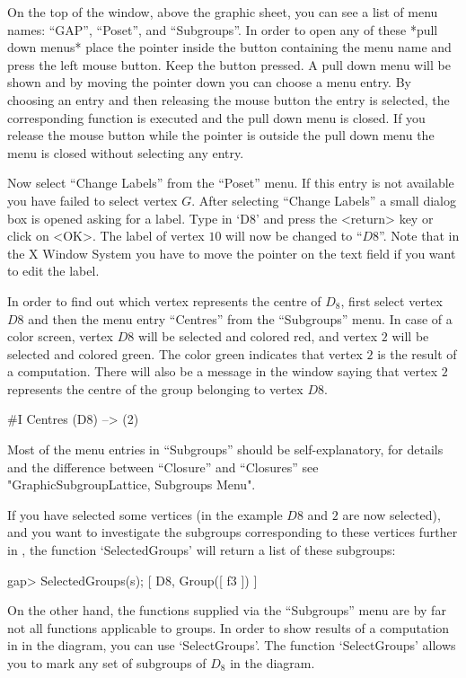 On the top of the window, above the graphic sheet,  you can see a list of
menu names: ``GAP'', ``Poset'', and ``Subgroups''.  In order to
open any of these *pull  down menus* place the  pointer inside the button
containing   the menu name  and press  the  left  mouse button.  Keep the
button pressed.  A pull down menu will be shown and by moving the pointer
down you  can choose  a   menu entry.  By choosing    an entry and   then
releasing  the  mouse button  the entry   is  selected, the corresponding
function is executed and  the pull down menu is  closed.  If  you release
the mouse button while the pointer is outside the pull down menu the menu
is closed without selecting any entry.

Now select ``Change Labels'' from the ``Poset'' menu.  If this entry is not
available you have failed to select vertex $G$.  After selecting ``Change
Labels'' a small dialog box is opened asking for a label.  Type in `D8' and
press the <return> key or click on <OK>.  The label of vertex $10$ will now
be changed to ``$D8$''. Note that in the X Window System you have to move
the pointer on the text field if you want to edit the label.

In order to find  out which vertex  represents the centre of $D_8$, first
select vertex $D8$ and then the menu entry ``Centres'' from the ``Subgroups''
menu.   In  case of  a  color screen, vertex $D8$   will  be selected and
colored  red, and vertex  $2$ will  be selected  and  colored green.  The
color green  indicates that vertex $2$  is  the result  of a computation.
There will also be a message in the {\GAP} window  saying that vertex $2$
represents the centre of the group belonging to vertex $D8$.

\begintt
#I  Centres (D8) --> (2)
\endtt

Most of  the menu entries  in ``Subgroups'' should be self-explanatory, for
details and  the   difference   between  ``Closure''  and    ``Closures'' see
"GraphicSubgroupLattice, Subgroups Menu".

If you have selected some vertices (in the example $D8$ and $2$ are now
selected), and you want to investigate the subgroups corresponding to these
vertices further in {\GAP}, the function `SelectedGroups' will return a
list of these subgroups:

\begintt
gap> SelectedGroups(s);
[ D8, Group([ f3 ]) ]
\endtt

On the other hand, the functions supplied via the ``Subgroups'' menu are by
far not all functions applicable to groups.  In order to show results of a
computation in {\GAP} in the diagram, you can use `SelectGroups'.  The
function `SelectGroups' allows you to mark any set of subgroups of $D_8$ in
the diagram.

